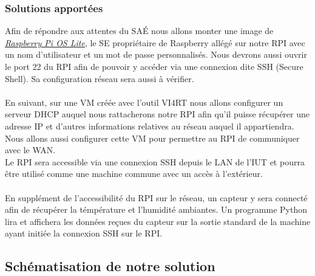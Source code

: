 \documentclass[a4paper]{article}
\begin{document}
\subsubsection{Solutions apportées}
Afin de répondre aux attentes du SAÉ nous allons monter une image de \href{https://www.raspberrypi.com/software/operating-systems/}{\textit{Raspberry Pi OS Lite}}, le SE propriétaire de Raspberry allégé sur notre RPI avec un nom d'utilisateur et un mot de passe personnalisés. Nous devrons aussi ouvrir le port 22 du RPI afin de pouvoir y accéder via une connexion dite SSH (Secure Shell). Sa configuration réseau sera aussi à vérifier.\\\\En suivant, sur une VM créée avec l'outil VI4RT nous allons configurer un serveur DHCP auquel nous rattacherons notre RPI afin qu'il puisse récupérer une adresse IP et d'autres informations relatives au réseau auquel il appartiendra. Nous allons aussi configurer cette VM pour permettre au RPI de communiquer avec le WAN.\\Le RPI sera accessible via une connexion SSH depuis le LAN de l'IUT et pourra être utilisé comme une machine commune avec un accès à l'extérieur.\\\\En supplément de l'accessibilité du RPI sur le réseau, un capteur y sera connecté afin de récupérer la témpérature et l'humidité ambiantes. Un programme Python lira et affichera les données reçues du capteur sur la sortie standard de la machine ayant initiée la connexion SSH sur le RPI.
\subsection{Schématisation de notre solution}
\end{document}
